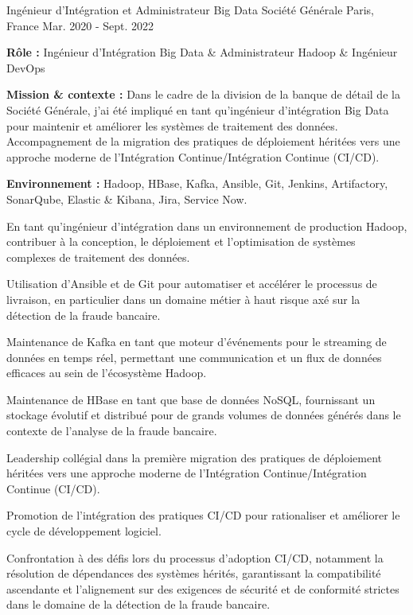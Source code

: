 \begin{cventries}
\cventry
{Ingénieur d'Intégration et Administrateur Big Data} %
{Société Générale} %
{Paris, France} %
{Mar. 2020 - Sept. 2022} %
{
  \begin{cvitems} %
    \item {\textbf{Rôle :} Ingénieur d'Intégration Big Data \& Administrateur Hadoop \& Ingénieur DevOps}
    \item {\textbf{Mission \& contexte :} Dans le cadre de la division de la banque de détail de la Société Générale, j'ai été impliqué en tant qu'ingénieur d'intégration Big Data pour maintenir et améliorer les systèmes de traitement des données. Accompagnement de la migration des pratiques de déploiement héritées vers une approche moderne de l'Intégration Continue/Intégration Continue (CI/CD).}
    \item {\textbf{Environnement :} Hadoop, HBase, Kafka, Ansible, Git, Jenkins, Artifactory, SonarQube, Elastic \& Kibana, Jira, Service Now.}
    \item {En tant qu'ingénieur d'intégration dans un environnement de production Hadoop, contribuer à la conception, le déploiement et l'optimisation de systèmes complexes de traitement des données.}
    \item {Utilisation d'Ansible et de Git pour automatiser et accélérer le processus de livraison, en particulier dans un domaine métier à haut risque axé sur la détection de la fraude bancaire.}
    \item {Maintenance de Kafka en tant que moteur d'événements pour le streaming de données en temps réel, permettant une communication et un flux de données efficaces au sein de l'écosystème Hadoop.}
    \item {Maintenance de HBase en tant que base de données NoSQL, fournissant un stockage évolutif et distribué pour de grands volumes de données générés dans le contexte de l'analyse de la fraude bancaire.}
    \item {Leadership collégial dans la première migration des pratiques de déploiement héritées vers une approche moderne de l'Intégration Continue/Intégration Continue (CI/CD).}
    \item {Promotion de l'intégration des pratiques CI/CD pour rationaliser et améliorer le cycle de développement logiciel.}
    \item {Confrontation à des défis lors du processus d'adoption CI/CD, notamment la résolution de dépendances des systèmes hérités, garantissant la compatibilité ascendante et l'alignement sur des exigences de sécurité et de conformité strictes dans le domaine de la détection de la fraude bancaire.}

\end{cvitems}}
\end{cventries}
